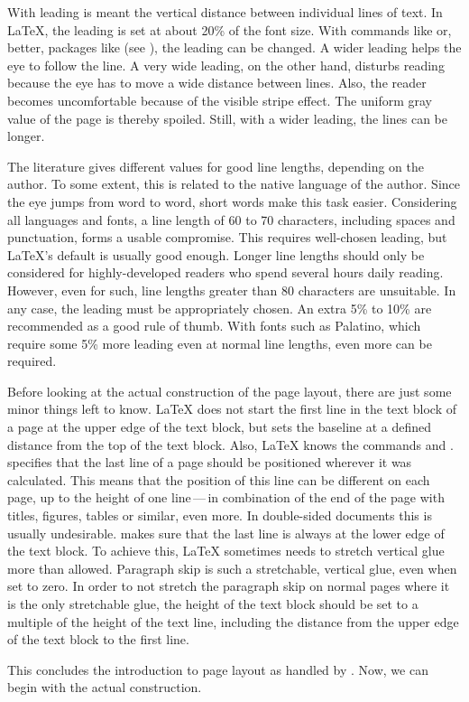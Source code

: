 \begin{Explain}
  With leading is meant the vertical
  distance between individual lines of text. In {\LaTeX}, the leading
  is set at about 20\% of the font size. With commands like
   or, better, packages like
   (see
  \cite{package:setspace}), the leading can be changed. A wider
  leading helps the eye to follow the line. A very wide leading, on
  the other hand, disturbs reading because the eye has to move a wide
  distance between lines. Also, the reader becomes uncomfortable
  because of the visible stripe effect. The uniform gray value of the
  page is thereby spoiled. Still, with a wider leading, the lines can
  be longer.

  The literature gives different values for good line
  lengths, depending on the author. To
  some extent, this is related to the native language of the
  author. Since the eye jumps from word to word, short words make this
  task easier. Considering all languages and fonts, a line length of
  60 to 70 characters, including spaces and punctuation, forms a
  usable compromise. This requires well-chosen leading, but {\LaTeX}'s
  default is usually good enough. Longer line lengths should only be
  considered for highly-developed readers who spend several hours
  daily reading. However, even for such, line lengths greater than 80
  characters are unsuitable. In any case, the leading must be
  appropriately chosen. An extra 5\% to 10\% are recommended as a good
  rule of thumb. With fonts such as Palatino, which require some 5\%
  more leading even at normal line lengths, even more can be
  required.

  Before looking at the actual construction of the page layout, there
  are just some minor things left to know. {\LaTeX} does not start the
  first line in the text block of a page at the upper edge of the text
  block, but sets the baseline at a defined distance from the top of
  the text block. Also, {\LaTeX} knows the commands
   and
  . 
  specifies that the last line of a page should be positioned wherever
  it was calculated. This means that the position of this line can be
  different on each page, up to the height of one line\,---\,in
  combination of the end of the page with titles, figures, tables or
  similar, even more. In double-sided documents this is usually
  undesirable.  makes sure that the last line is
  always at the lower edge of the text block. To achieve this,
  {\LaTeX} sometimes needs to stretch vertical glue more than
  allowed. Paragraph skip is such a stretchable, vertical glue, even
  when set to zero.  In order to not stretch the paragraph skip on
  normal pages where it is the only stretchable glue, the height of
  the text block should be set to a multiple of the height of the text
  line, including the distance from the upper edge of the text block
  to the first line.

  This concludes the introduction to page layout as handled by
  {\KOMAScript}. Now, we can begin with the actual construction.
\end{Explain}


